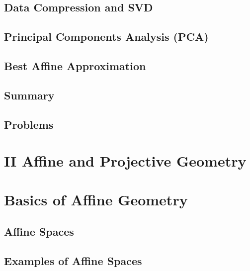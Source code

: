 \documentclass[a4paper]{article}
\begin{document}
\subsection{ Data Compression and SVD} %

\subsection{ Principal Components Analysis (PCA)} %

\subsection{ Best Affine Approximation} %

\subsection{ Summary} %

\subsection{ Problems} %


\section*{II Affine and Projective Geometry}
\newpage
\section{Basics of Affine Geometry}
\subsection{ Affine Spaces} %

\subsection{ Examples of Affine Spaces} %
\end{document}
